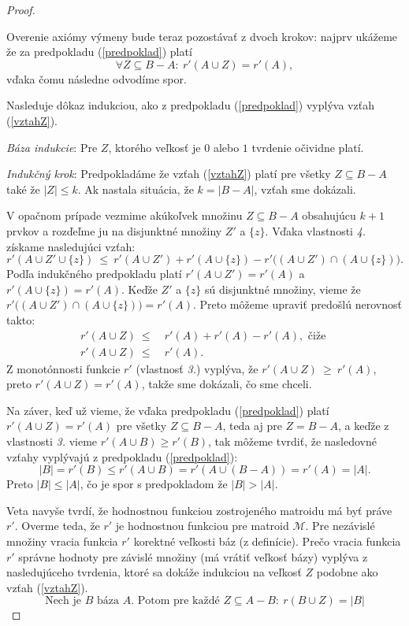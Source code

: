 \begin{proof}
\begin{enumerate}
		\medskip
		Overenie axiómy výmeny bude teraz pozostávať z dvoch krokov: najprv ukážeme že za predpokladu (\ref{predpoklad}) platí
		\begin{equation}
			\label{vztahZ}
			\forall Z \subseteq B{-}A:~ r'( A \cup Z ) = r'(A),
		\end{equation}
		vďaka čomu následne odvodíme spor.


		Nasleduje dôkaz indukciou, ako z predpokladu (\ref{predpoklad}) vyplýva vzťah (\ref{vztahZ}).

		{\it Báza indukcie}:
			Pre $Z$, ktorého veľkosť je $0$ alebo $1$ tvrdenie očividne platí.

		{\it Indukčný krok}:
			Predpokladáme že vzťah (\ref{vztahZ}) platí pre všetky $Z \subseteq B{-}A$  také že $|Z| \le k$. Ak nastala situácia, že $k=|B{-}A|$, vzťah sme dokázali.

			V opačnom prípade vezmime akúkoľvek množinu $Z \subseteq B{-}A$ obsahujúcu $k+1$ prvkov a rozďeľme ju na disjunktné množiny $Z'$ a $\{z\}$. Vďaka vlastnosti {\it 4.} získame nasledujúci vzťah:
			$$ r'(A \cup Z' \cup \{z\})  ~\le~  r'(A \cup Z') + r'(A \cup \{z\}) - r'\big((A \cup Z') \cap (A \cup \{z\})\big). $$
			Podľa indukčného predpokladu platí $r'(A \cup Z') = r'(A)$ a $r'(A \cup \{z\}) = r'(A)$. Keďže $Z'$ a $\{z\}$ sú disjunktné množiny, vieme že $r'\big((A \cup Z') \cap (A \cup \{z\})\big) = r'(A)$. Preto môžeme upraviť predošlú nerovnosť takto:
			\begin{align*}
			r'(A \cup Z ) ~\le&~ r'(A) + r'(A) - r'(A), \text{ čiže }\\
			r'(A \cup Z ) ~\le&~ r'(A).
			\end{align*}
			Z monotónnosti funkcie $r'$ (vlastnosť {\it 3.}) vyplýva, že $r'(A \cup Z ) ~\ge~ r'(A)$, preto $r'(A \cup Z ) = r'(A)$, takže sme dokázali, čo sme chceli.


		\medskip
		Na záver, keď už vieme, že vďaka predpokladu (\ref{predpoklad}) platí $r'( A \cup Z ) = r'(A)$ pre všetky $Z \subseteq B{-}A$, teda aj pre $Z=B{-}A$, a keďže z vlastnosti {\it 3.} vieme $r'(A \cup B) \ge r'(B)$, tak môžeme tvrdiť, že nasledovné vzťahy vyplývajú z predpokladu (\ref{predpoklad}):
		$$ |B| = r'(B) \le r'(A \cup B) = r'(A \cup (B{-}A)) = r'(A) = |A|. $$
		Preto $|B| \le |A|$, čo je spor s predpokladom že $|B| > |A|$.

	\end{enumerate}

	\medskip
	Veta navyše tvrdí, že hodnostnou funkciou zostrojeného matroidu má byť práve $r'$. Overme teda, že $r'$ je hodnostnou funkciou pre matroid $\mathcal{M}$. Pre nezávislé množiny vracia funkcia $r'$ korektné veľkosti báz (z definície). Prečo vracia funkcia $r'$ správne hodnoty pre závislé množiny (má vrátiť veľkosť bázy) vyplýva z nasledujúceho tvrdenia, ktoré sa dokáže indukciou na veľkosť $Z$ podobne ako vzťah (\ref{vztahZ}).
	$$ \text{Nech je $B$ báza $A$. Potom pre každé } Z \subseteq A{-}B: ~ r(B \cup Z) = |B| $$


\end{proof}
